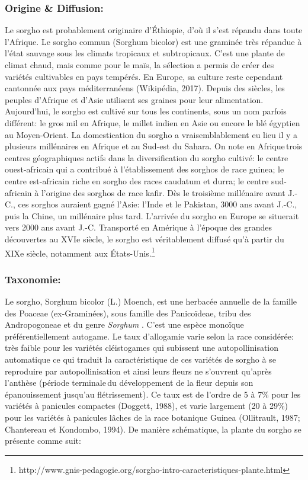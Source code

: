 \documentclass[a4paper,11pt]{article}
\begin{document}
  
\subsubsection{Origine \& Diffusion:}
Le sorgho est probablement originaire d’Éthiopie, d’où il s’est
répandu dans toute l’Afrique. Le sorgho commun (Sorghum bicolor) est
une graminée très répandue à l’état sauvage sous les climats tropicaux
et subtropicaux. C’est une plante de climat chaud, mais comme pour le
maïs, la sélection a permis de créer des variétés cultivables en pays
tempérés. En Europe, sa culture reste cependant cantonnée aux pays
méditerranéens (Wikipédia, 2017). Depuis des siècles, les peuples
d’Afrique et d’Asie utilisent ses graines pour leur
alimentation. Aujourd’hui, le sorgho est cultivé sur tous les
continents, sous un nom parfois différent: le gros mil en Afrique, le
millet indien en Asie ou encore le blé égyptien au Moyen-Orient. La
domestication du sorgho a vraisemblablement eu lieu il y a plusieurs
millénaires en Afrique et au Sud-est du Sahara.  On note en
Afrique\,trois centres géographiques actifs dans la diversification du
sorgho cultivé: le centre ouest-africain qui a contribué à
l’établissement des sorghos de race guinea; le centre est-africain
riche en sorgho des races caudatum et durra; le centre sud-africain à
l’origine des sorghos de race kafir. Dès le troisième millénaire
avant J.-C., ces sorghos auraient gagné l’Asie: l’Inde et le Pakistan,
3000 ans avant J.-C., puis la Chine, un millénaire plus
tard. L’arrivée du sorgho en Europe se situerait vers 2000 ans avant
J.-C. Transporté en Amérique à l’époque des grandes découvertes au
XVIe siècle, le sorgho est véritablement diffusé qu’à partir du XIXe
siècle, notamment aux
États-Unis.\footnote{http://www.gnis-pedagogie.org/sorgho-intro-caracteristiques-plante.html}

\subsubsection{Taxonomie:}
Le sorgho, Sorghum bicolor (L.) Moench, est une herbacée annuelle de
la famille des Poaceae (ex-Graminées), sous famille des Panicoïdeae,
tribu des Andropogoneae et du genre \emph{Sorghum}
\cite{Doggett_1988}. C’est une espèce monoïque préférentiellement
autogame. Le taux d’allogamie varie selon la race considérée: très
faible pour les variétés cléistogames qui subissent une
autopollinisation automatique ce qui traduit la caractéristique de ces
variétés de sorgho à se reproduire par autopollinisation et ainsi
leurs fleurs ne s’ouvrent qu’après l’anthèse (période terminale\,du
développement de la fleur depuis son épanouissement jusqu’au
flétrissement). Ce taux est de l’ordre de 5 à 7\% pour les variétés à
panicules compactes (Doggett, 1988), et varie largement (20 à 29\%)
pour les variétés à panicules lâches de la race botanique Guinea
(Ollitrault, 1987; Chantereau et Kondombo, 1994). De manière
schématique, la plante du sorgho se présente comme suit:
\end{document}
